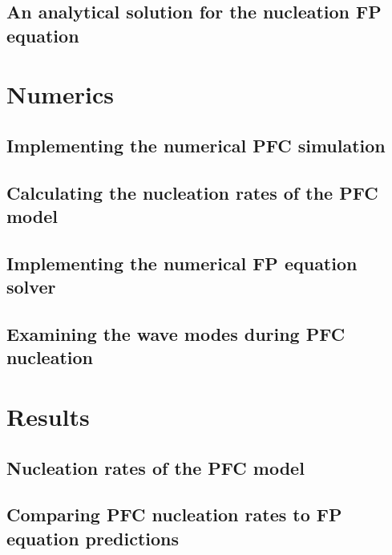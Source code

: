\documentclass[a4paper]{article}
\begin{document}
\subsection{An analytical solution for the nucleation FP equation}\label{subsec:ansol_fopl}

\section{Numerics}\label{sec:numerics}

\subsection{Implementing the numerical PFC simulation}\label{subsec:num_pfc}
\subsection{Calculating the nucleation rates of the PFC model}\label{subsec:num_rates}
\subsection{Implementing the numerical FP equation solver}\label{subsec:num_fopl}
\subsection{Examining the wave modes during PFC nucleation}\label{subsec:num_wave}

\section{Results}\label{sec:results}

\subsection{Nucleation rates of the PFC model}\label{subsec:rates_pfc}
\subsection{Comparing PFC nucleation rates to FP equation predictions}\label{subsec:compare_pfc_fopl}
\end{document}
